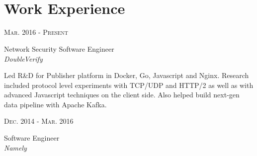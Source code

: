 \documentclass[10pt]{article} %
\begin{document}
\color{text1} %


\par{\\ %
\par{}\\
	

\begin{minipage}[t]{0.5\textwidth} %
\vspace{0pt} %
	

\section{Work Experience} 


{\raggedleft\textsc{Mar. 2016 - Present}\par}
{\raggedright\large Network Security Software Engineer\\
\textit{DoubleVerify}\\[5pt]}

\small{Led R\&D for Publisher platform in Docker, Go, Javascript and Nginx. Research included protocol level experiments with TCP/UDP and HTTP/2 as well as with advanced Javascript techniques on the client side. Also helped build next-gen data pipeline with Apache Kafka.}\\


{\raggedleft\textsc{Dec. 2014 - Mar. 2016}\par}
{\raggedright\large Software Engineer\\
\textit{Namely}\\[5pt]}


\end{minipage}}
\end{document}
